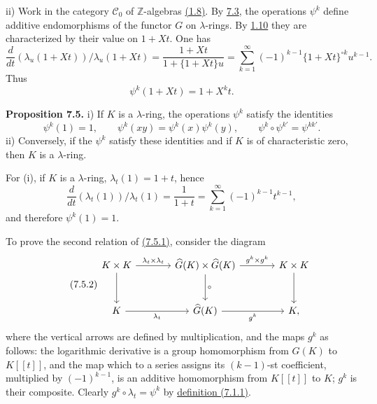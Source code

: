 ii) Work in the category \(\mathscr C_0\) of \(\mathbb Z\)-algebras \hyperlink{sga6.e05.para.1-8}{(1.8)}. By \hyperlink{sga6.e05.para.7-3}{7.3}, the operations \(\psi^k\) define additive endomorphisms of the functor \(G\) on \(\lambda\)-rings. By \hyperlink{sga6.e05.thm.1-10}{1.10} they are characterized by their value on \(1+Xt\). One has
\[
  \frac{d}{dt}(\lambda_u(1+Xt))/\lambda_u(1+Xt)
  =
  \frac{1+Xt}{1+\{1+Xt\}u}
  =
  \sum_{k=1}^{\infty}(-1)^{k-1}\{1+Xt\}^{\circ k}u^{k-1}.
\]
Thus
\begin{equation}\tag{7.4.1}
  \psi^k(1+Xt)=1+X^k t.
\end{equation}

\textbf{Proposition 7.5.} i) If \(K\) is a \(\lambda\)-ring, the operations \(\psi^k\) satisfy the identities
\begin{equation}\tag{7.5.1}
  \psi^k(1)=1,\qquad
  \psi^k(xy)=\psi^k(x)\psi^k(y),\qquad
  \psi^k\circ\psi^{k'}=\psi^{kk'}.
\end{equation}
ii) Conversely, if the \(\psi^k\) satisfy these identities and if \(K\) is of characteristic zero, then \(K\) is a \(\lambda\)-ring.

For (i), if \(K\) is a \(\lambda\)-ring, \(\lambda_t(1)=1+t\), hence
\[
  \frac{d}{dt}(\lambda_t(1))/\lambda_t(1)
  =
  \frac1{1+t}
  =
  \sum_{k=1}^{\infty}(-1)^{k-1}t^{k-1},
\]
and therefore \(\psi^k(1)=1\).

To prove the second relation of \hyperlink{sga6.e05.eq.7-5-1}{(7.5.1)}, consider the diagram
\begin{equation}\tag{7.5.2}
\begin{tikzcd}[column sep=large,row sep=large]
K\times K \arrow[r,"\lambda_t\times\lambda_t"] \arrow[d] &
\widehat G(K)\times\widehat G(K) \arrow[r,"g^k\times g^k"] \arrow[d,"\circ"] &
K\times K \arrow[d]\\
K \arrow[r,"\lambda_t"'] &
\widehat G(K) \arrow[r,"g^k"'] &
K ,
\end{tikzcd}
\end{equation}
where the vertical arrows are defined by multiplication, and the maps \(g^k\) as follows: the logarithmic derivative is a group homomorphism from \(G(K)\) to \(K[[t]]\), and the map which to a series assigns its \((k-1)\)-st coefficient, multiplied by \((-1)^{k-1}\), is an additive homomorphism from \(K[[t]]\) to \(K\); \(g^k\) is their composite. Clearly \(g^k\circ\lambda_t=\psi^k\) by \hyperlink{sga6.e05.eq.7-1-1}{definition (7.1.1)}.

